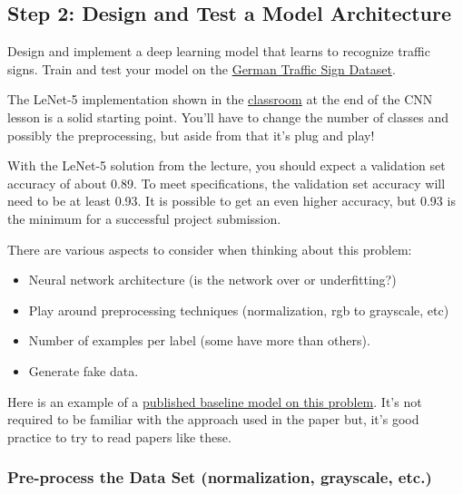 \documentclass[11pt]{article}
\providecommand{\tightlist}{%
      \setlength{\itemsep}{0pt}\setlength{\parskip}{0pt}}
\begin{document}
\hypertarget{step-2-design-and-test-a-model-architecture}{%
\subsection{Step 2: Design and Test a Model
Architecture}\label{step-2-design-and-test-a-model-architecture}}

Design and implement a deep learning model that learns to recognize
traffic signs. Train and test your model on the
\href{http://benchmark.ini.rub.de/?section=gtsrb\&subsection=dataset}{German
Traffic Sign Dataset}.

The LeNet-5 implementation shown in the
\href{https://classroom.udacity.com/nanodegrees/nd013/parts/fbf77062-5703-404e-b60c-95b78b2f3f9e/modules/6df7ae49-c61c-4bb2-a23e-6527e69209ec/lessons/601ae704-1035-4287-8b11-e2c2716217ad/concepts/d4aca031-508f-4e0b-b493-e7b706120f81}{classroom}
at the end of the CNN lesson is a solid starting point. You'll have to
change the number of classes and possibly the preprocessing, but aside
from that it's plug and play!

With the LeNet-5 solution from the lecture, you should expect a
validation set accuracy of about 0.89. To meet specifications, the
validation set accuracy will need to be at least 0.93. It is possible to
get an even higher accuracy, but 0.93 is the minimum for a successful
project submission.

There are various aspects to consider when thinking about this problem:

\begin{itemize}
\tightlist
\item
  Neural network architecture (is the network over or underfitting?)
\item
  Play around preprocessing techniques (normalization, rgb to grayscale,
  etc)
\item
  Number of examples per label (some have more than others).
\item
  Generate fake data.
\end{itemize}

Here is an example of a
\href{http://yann.lecun.com/exdb/publis/pdf/sermanet-ijcnn-11.pdf}{published
baseline model on this problem}. It's not required to be familiar with
the approach used in the paper but, it's good practice to try to read
papers like these.

    \hypertarget{pre-process-the-data-set-normalization-grayscale-etc.}{%
\subsubsection{Pre-process the Data Set (normalization, grayscale,
etc.)}\label{pre-process-the-data-set-normalization-grayscale-etc.}}
\end{document}
